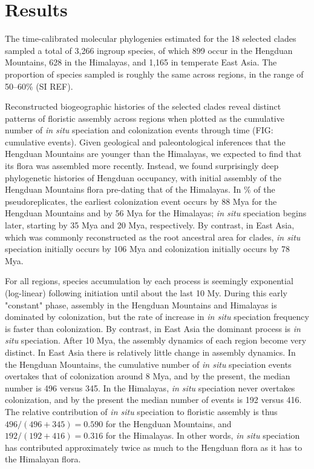 \section{Results}

The time-calibrated molecular phylogenies estimated for the 18 selected clades sampled a total of 3,266 ingroup species, of which 899 occur in the Hengduan Mountains, 628 in the Himalayas, and 1,165 in temperate East Asia. The proportion of species sampled is roughly the same across regions, in the range of 50--60\% (SI REF).

Reconstructed biogeographic histories of the selected clades reveal distinct patterns of floristic assembly across regions when plotted as the cumulative number of \textit{in situ} speciation and colonization events through time (FIG: cumulative events). Given geological and paleontological inferences that the Hengduan Mountains are younger than the Himalayas, we expected to find that its flora was assembled more recently. Instead, we found surprisingly deep phylogenetic histories of Hengduan occupancy, with initial assembly of the Hengduan Mountains flora pre-dating that of the Himalayas. In \% of the pseudoreplicates, the earliest colonization event occurs by 88 Mya for the Hengduan Mountains and by 56 Mya for the Himalayas; \textit{in situ} speciation begins later, starting by 35 Mya and 20 Mya, respectively. By contrast, in East Asia, which was commonly reconstructed as the root ancestral area for clades, \textit{in situ} speciation initially occurs by 106 Mya and colonization initially occurs by 78 Mya.

For all regions, species accumulation by each process is seemingly exponential (log-linear) following initiation until about the last 10 My. During this early "constant" phase, assembly in the Hengduan Mountains and Himalayas is dominated by colonization, but the rate of increase in \textit{in situ} speciation frequency is faster than colonization. By contrast, in East Asia the dominant process is \textit{in situ} speciation.  After 10 Mya, the assembly dynamics of each region become very distinct. In East Asia there is relatively little change in assembly dynamics. In the Hengduan Mountains, the cumulative number of \textit{in situ} speciation events overtakes that of colonization around 8 Mya, and by the present, the median number is 496 versus 345. In the Himalayas, \textit{in situ} speciation never overtakes colonization, and by the present the median number of events is 192 versus 416. The relative contribution of \textit{in situ} speciation to floristic assembly is thus $496/(496+345) = 0.590$ for the Hengduan Mountains, and $192/(192+416) = 0.316$ for the Himalayas. In other words, \textit{in situ} speciation has contributed approximately twice as much to the Hengduan flora as it has to the Himalayan flora. 